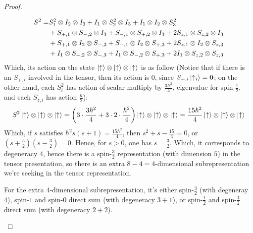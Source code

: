 \documentclass{article}
\begin{document}
\begin{proof}
\begin{itemize}
        \begin{align}
            S^2 =& S_1^2 \otimes I_2\otimes I_3+I_1 \otimes S_2^2\otimes I_3+I_1\otimes I_2\otimes S_3^2\\
            &+ S_{+,1}\otimes S_{-,2}\otimes I_3+S_{-,1}\otimes S_{+,2}\otimes I_3+2S_{z,1}\otimes S_{z,2}\otimes I_3\\
            &+ S_{+,1}\otimes I_2\otimes S_{-,3}+S_{-,1}\otimes I_2\otimes S_{+,3}+2S_{z,1}\otimes I_2\otimes S_{z,3}\\
            &+ I_1\otimes S_{+,2}\otimes S_{-,3}+I_1 \otimes S_{-,2}\otimes S_{+,3}+2I_1\otimes S_{z,2}\otimes S_{z,3}
        \end{align}
        Which, its action on the state $\ket{\uparrow}\otimes\ket{\uparrow}\otimes \ket{\uparrow}$ is as follow (Notice that if there is an $S_{+,i}$ involved in the tensor, then its action is $0$, since $S_{+,i}\ket{\uparrow_i} = \mathbf{0}$; on the other hand, each $S_i^2$ has action of scalar multiply by $\frac{3\hbar^2}{4}$, eigenvalue for spin-$\frac{1}{2}$, and each $S_{z,i}$ has action $\frac{\hbar}{2}$):
        \begin{align}
            S^2 \ket{\uparrow}\otimes\ket{\uparrow}\otimes \ket{\uparrow} = \left(3 \cdot \frac{3\hbar^2}{4} + 3 \cdot 2 \cdot \frac{\hbar^2}{4}\right)\ket{\uparrow}\otimes\ket{\uparrow}\otimes \ket{\uparrow} = \frac{15\hbar^2}{4}\ket{\uparrow}\otimes\ket{\uparrow}\otimes \ket{\uparrow}
        \end{align}
        Which, if $s$ satisfies $\hbar^2 s(s+1) = \frac{15\hbar^2}{4}$, then $s^2+s-\frac{15}{4} = 0$, or $(s+\frac{5}{2})(s-\frac{3}{2})=0$. Hence, for $s>0$, one has $s=\frac{3}{2}$. Which, it corresponds to degeneracy $4$, hence there is a spin-$\frac{3}{2}$ representation (with dimension $5$) in the tensor presentation, so there is an extra $8-4=4$-dimensional subrepresentation we're seeking in the tensor representation.

        \hfil

        For the extra $4$-dimensional subrepresentation, it's either spin-$\frac{3}{2}$ (with degeneray $4$), spin-$1$ and spin-$0$ direct sum (with degeneracy $3+1$), or spin-$\frac{1}{2}$ and spin-$\frac{1}{2}$ direct sum (with degeneracy $2+2$).


\end{itemize}
\end{proof}
\end{document}
